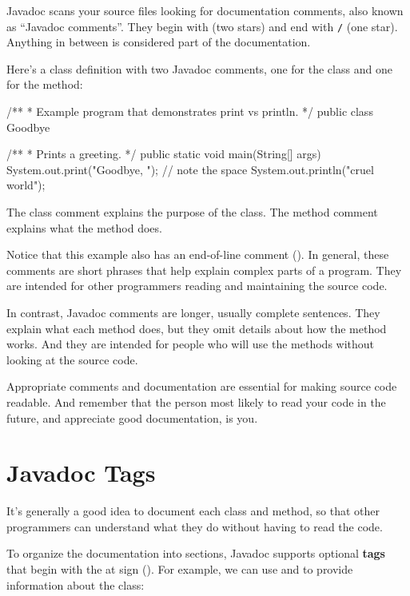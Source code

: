 Javadoc scans your source files looking for documentation comments, also known as ``Javadoc comments''.
They begin with \java{/**} (two stars) and end with \textcolor{comment}{\tt */} (one star).
Anything in between is considered part of the documentation.

Here's a class definition with two Javadoc comments, one for the  class and one for the  method:

\begin{code}
/**
 * Example program that demonstrates print vs println.
 */
public class Goodbye {

    /**
     * Prints a greeting.
     */
    public static void main(String[] args) {
        System.out.print("Goodbye, ");  // note the space
        System.out.println("cruel world");
    }
}
\end{code}

The class comment explains the purpose of the class.
The method comment explains what the method does.

Notice that this example also has an end-of-line comment (\java{//}).
In general, these comments are short phrases that help explain complex parts of a program.
They are intended for other programmers reading and maintaining the source code.

In contrast, Javadoc comments are longer, usually complete sentences.
They explain what each method does, but they omit details about how the method works.
And they are intended for people who will use the methods without looking at the source code.

Appropriate comments and documentation are essential for making source code readable.
And remember that the person most likely to read your code in the future, and appreciate good documentation, is you.


\section{Javadoc Tags}

It's generally a good idea to document each class and method, so that other programmers can understand what they do without having to read the code.


To organize the documentation into sections, Javadoc supports optional {\bf tags} that begin with the at sign ().
For example, we can use  and  to provide information about the class:

